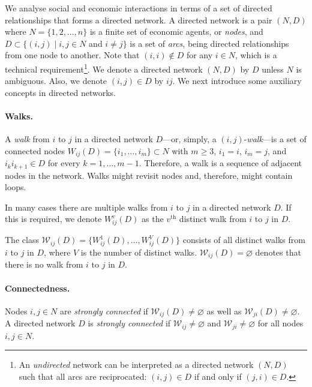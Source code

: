 We analyse social and economic interactions in terms of a set of directed relationships that forms a directed network. A directed network is a pair $(N,D)$ where $N = \{1,2, \ldots ,n\}$ is a finite set of economic agents, or \emph{nodes}, and $D \subset \{ (i,j) \mid i,j \in N$ and $i \neq j \}$ is a set of \emph{arcs}, being directed relationships from one node to another. Note that $(i,i) \notin D$ for any $i \in N$, which is a technical requirement\footnote{An \emph{undirected} network can be interpreted as a directed network $(N,D)$ such that all arcs are reciprocated: $(i,j) \in D$ if and only if $(j,i) \in D$.}. We denote a directed network $(N,D)$ by $D$ unless $N$ is ambiguous. Also, we denote $(i,j) \in D$ by $ij$. We next introduce some auxiliary concepts in directed networks.

\paragraph{Walks.}

A \textit{walk} from $i$ to $j$ in a directed network $D$---or, simply, a $(i,j)$-\emph{walk}---is a set of connected nodes $W_{ij} (D) = \{ i_{1}, \ldots ,i_{m} \} \subset N$ with $m \geqslant 3$, $i_1 =i$, $i_m =j$, and $i_{k}i_{k+1} \in D$ for every $k=1, \ldots ,m-1$. Therefore, a walk is a sequence of adjacent nodes in the network. Walks might revisit nodes and, therefore, might contain loops.

In many cases there are multiple walks from $i$ to $j$ in a directed network $D$. If this is required, we denote $W_{ij}^{v}(D)$ as the $v^{\mbox{th}}$ distinct walk from $i$ to $j$ in $D$.

The class $\mathcal{W}_{ij}(D)= \{ W_{ij}^{1}(D), \ldots ,W_{ij}^{V}(D) \}$ consists of all distinct walks from $i$ to $j$ in $D$, where $V$ is the number of distinct walks. $\mathcal{W}_{ij}(D)= \varnothing$ denotes that there is no walk from $i$ to $j$ in $D$.

\paragraph{Connectedness.}

Nodes $i,j \in N$ are \textit{strongly connected} if $\mathcal{W}_{ij}(D) \neq \varnothing$ as well as $\mathcal{W}_{ji}(D) \neq \varnothing$. A directed network $D$ is \emph{strongly connected} if $\mathcal{W}_{ij} \neq \varnothing$ and $\mathcal{W}_{ji} \neq \varnothing$ for all nodes $i,j \in N$.


